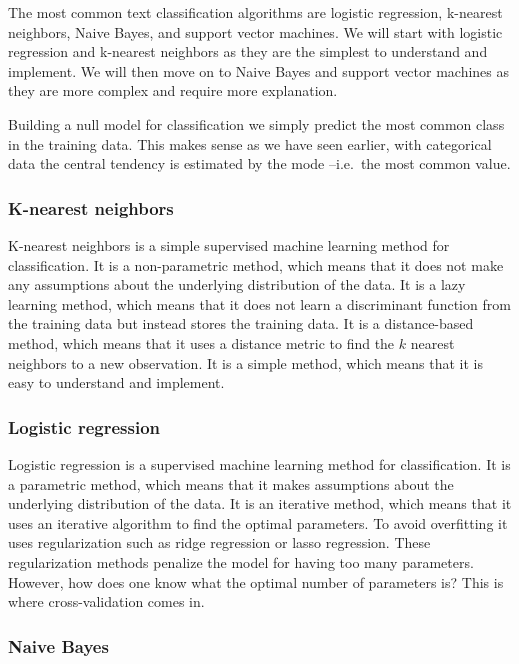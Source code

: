 \documentclass[
  letterpaper,
]{latex/krantz}
\begin{document}
The most common text classification algorithms are logistic regression,
k-nearest neighbors, Naive Bayes, and support vector machines. We will
start with logistic regression and k-nearest neighbors as they are the
simplest to understand and implement. We will then move on to Naive
Bayes and support vector machines as they are more complex and require
more explanation.

Building a null model for classification we simply predict the most
common class in the training data. This makes sense as we have seen
earlier, with categorical data the central tendency is estimated by the
mode --i.e.~the most common value.

\hypertarget{pda-k-nearest-neighbors}{%
\subsubsection{K-nearest neighbors}\label{pda-k-nearest-neighbors}}

K-nearest neighbors is a simple supervised machine learning method for
classification. It is a non-parametric method, which means that it does
not make any assumptions about the underlying distribution of the data.
It is a lazy learning method, which means that it does not learn a
discriminant function from the training data but instead stores the
training data. It is a distance-based method, which means that it uses a
distance metric to find the \(k\) nearest neighbors to a new
observation. It is a simple method, which means that it is easy to
understand and implement.

\hypertarget{pda-logistic-regression}{%
\subsubsection{Logistic regression}\label{pda-logistic-regression}}

Logistic regression is a supervised machine learning method for
classification. It is a parametric method, which means that it makes
assumptions about the underlying distribution of the data. It is an
iterative method, which means that it uses an iterative algorithm to
find the optimal parameters. To avoid overfitting it uses regularization
such as ridge regression or lasso regression. These regularization
methods penalize the model for having too many parameters. However, how
does one know what the optimal number of parameters is? This is where
cross-validation comes in.

\hypertarget{pda-naive-bayes}{%
\subsubsection{Naive Bayes}\label{pda-naive-bayes}}
\end{document}
